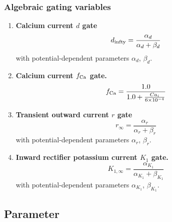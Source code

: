 \documentclass{scrartcl}
\begin{document}
\subsubsection{Algebraic gating variables}
\begin{enumerate}
\item {\bf Calcium current $d$ gate}
\begin{equation}
	d_{\rm infty} = \frac{\alpha_d}{\alpha_d + \beta_d}
\end{equation}
with potential-dependent parameters $\alpha_d$, $\beta_d$.
\item {\bf Calcium current $f_{\rm Ca}$ gate.}
\begin{equation}
	f_{\rm Ca} = \frac{1.0}{1.0 + \frac{Ca_i}{6 \times 10^{-4}}}
\end{equation}
\item {\bf Transient outward current $r$ gate}
\begin{equation}
	r_{\infty} = \frac{\alpha_r}{\alpha_r + \beta_r}
\end{equation}
with potential-dependent parameters $\alpha_r$, $\beta_r$.
\item {\bf Inward rectifier potassium current $K_1$ gate.}
\begin{equation}
	K_{1, \infty} = \frac{\alpha_{K_1}}{\alpha_{K_1} + \beta_{K_1}}
\end{equation}
with potential-dependent parameters $\alpha_{K_1}$, $\beta_{K_1}$.
\end{enumerate}
\subsection{Parameter}
\end{document}

